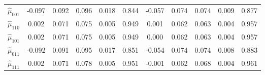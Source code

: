 \documentclass[
]{article}
\begin{document}
\begin{table}[!h]
{\begin{tabular}[t]{ccccccccccc}
$\hat{\mu}_{001}$ & -0.097 & 0.092 & 0.096 & 0.018 & 0.844 & -0.057 & 0.074 & 0.074 & 0.009 & 0.877\\
$\hat{\mu}_{110}$ & 0.002 & 0.071 & 0.075 & 0.005 & 0.949 & 0.001 & 0.062 & 0.063 & 0.004 & 0.957\\
$\hat{\mu}_{101}$ & 0.002 & 0.071 & 0.075 & 0.005 & 0.949 & 0.000 & 0.062 & 0.063 & 0.004 & 0.957\\
$\hat{\mu}_{011}$ & -0.092 & 0.091 & 0.095 & 0.017 & 0.851 & -0.054 & 0.074 & 0.074 & 0.008 & 0.883\\
$\hat{\mu}_{111}$ & 0.002 & 0.071 & 0.078 & 0.005 & 0.951 & -0.001 & 0.062 & 0.068 & 0.004 & 0.961\\
\bottomrule
\end{tabular}}
\end{table}

\begin{table}[!h]
\centering
\caption{\label{tab:unnamed-chunk-2}Comparison between different estimators under the Scenario 1 of Setting 2 with $\mu_0$ approximately 0.624. The $\boldsymbol{\alpha}_0$ in $\pi(\boldsymbol{U}, Y; \boldsymbol{\alpha}_0)$ that leads to $50\%$ of missingness in $Y$ is $(-0.1, 0.5, -0.5, -0.1)^{\top}$ and that leads to $30\%$ of missingness is $(-0.8, 0.5, -0.5, -0.1)^{\top}$.}
\centering
{}
\end{table}
\end{document}
